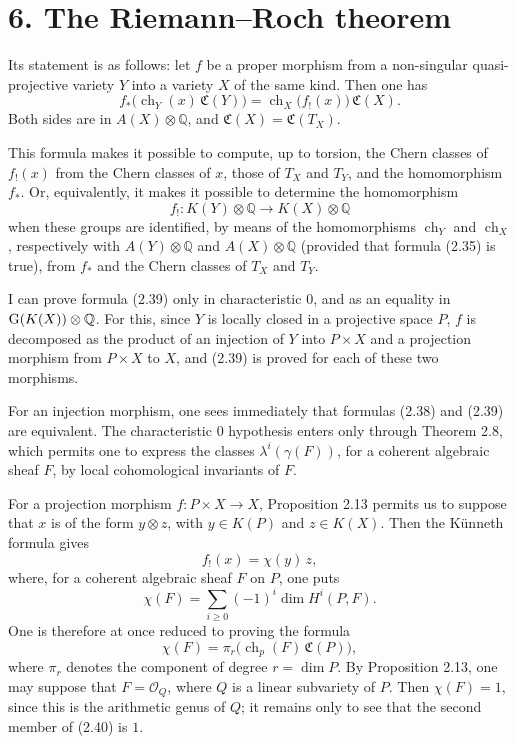\documentclass[11pt]{article}
\newcommand{\ch}{\operatorname{ch}}
\providecommand{\ch}{\operatorname{ch}}
\begin{document}
\section*{6. The Riemann--Roch theorem}

Its statement is as follows: let \(f\) be a proper morphism from a non-singular quasi-projective variety \(Y\) into a variety \(X\) of the same kind. Then one has
\begin{equation}\tag{2.39}
 f_*\bigl(\ch_Y(x)\,\mathfrak C(Y)\bigr)
 =
 \ch_X\bigl(f_!(x)\bigr)\,\mathfrak C(X).
\end{equation}
Both sides are in \(A(X)\otimes \mathbb Q\), and \(\mathfrak C(X)=\mathfrak C(T_X)\).

This formula makes it possible to compute, up to torsion, the Chern classes of \(f_!(x)\) from the Chern classes of \(x\), those of \(T_X\) and \(T_Y\), and the homomorphism \(f_*\). Or, equivalently, it makes it possible to determine the homomorphism
\[
  f_!:K(Y)\otimes \mathbb Q \longrightarrow K(X)\otimes \mathbb Q
\]
when these groups are identified, by means of the homomorphisms \(\ch_Y\) and \(\ch_X\), respectively with \(A(Y)\otimes \mathbb Q\) and \(A(X)\otimes \mathbb Q\) (provided that formula (2.35) is true), from \(f_*\) and the Chern classes of \(T_X\) and \(T_Y\).

I can prove formula (2.39) only in characteristic \(0\), and as an equality in \(\mathrm{G}(K(X))\otimes\mathbb Q\). For this, since \(Y\) is locally closed in a projective space \(P\), \(f\) is decomposed as the product of an injection of \(Y\) into \(P\times X\) and a projection morphism from \(P\times X\) to \(X\), and (2.39) is proved for each of these two morphisms.

For an injection morphism, one sees immediately that formulas (2.38) and (2.39) are equivalent. The characteristic \(0\) hypothesis enters only through Theorem 2.8, which permits one to express the classes \(\lambda^i(\gamma(F))\), for a coherent algebraic sheaf \(F\), by local cohomological invariants of \(F\).

For a projection morphism \(f:P\times X\to X\), Proposition 2.13 permits us to suppose that \(x\) is of the form \(y\otimes z\), with \(y\in K(P)\) and \(z\in K(X)\). Then the Künneth formula gives
\[
  f_!(x)=\chi(y)\,z,
\]
where, for a coherent algebraic sheaf \(F\) on \(P\), one puts
\[
  \chi(F)=\sum_{i\geq 0}(-1)^i\dim H^i(P,F).
\]
One is therefore at once reduced to proving the formula
\begin{equation}\tag{2.40}
  \chi(F)=\pi_r\bigl(\ch_p(F)\,\mathfrak C(P)\bigr),
\end{equation}
where \(\pi_r\) denotes the component of degree \(r=\dim P\). By Proposition 2.13, one may suppose that \(F=\mathcal O_Q\), where \(Q\) is a linear subvariety of \(P\). Then \(\chi(F)=1\), since this is the arithmetic genus of \(Q\); it remains only to see that the second member of (2.40) is \(1\).
\end{document}
